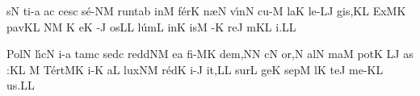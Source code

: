 \smallskip


\initiumgregorianum
{}%
s\punctum N\egn
\sgn ti-\punctum a\egn
\sgn {}a{}\punctum c\egn
\spatium
\sgn ces\punctum c\egn
\sgn s{\'e}-\clivis NM\egn
\sgn ru{nt}\punctum a\augmentum b\egn
\spatium
\divisiominima
\spatium
\sgn {}in\punctum M\egn
\sgn f{\'e}r\punctum K\egn
\sgn n{\ae}{}\punctum N\egn
\spatium
\sgn v{\'\i}n\punctum N\egn
\sgn cu-\punctum M\egn
\sgn la{}\punctum K\egn
\spatium
\sgn l{e}-\clivis LJ\egn
\sgn gi{s,}\punctum K\augmentum L\egn
\spatium
\divisiominor
\spatium
\sgn {}Ex\clivis MK\egn
\sgn pav\pes KL\egn
{}\clivis NM\egn
\custos K
\lineaproxima
{}e{}\punctum K\egn
\spatium
{}-\punctum J\egn
\sgn {}os\punctum L\augmentum L\egn
\spatium
\divisiominima
\spatium
\sgn l{\'u}m\punctum L\egn
\sgn {}in\punctum K\egn
\sgn {}is\punctum M\egn
\spatium
{}-\punctum K\egn
\sgn re{}\punctum J\egn
\spatium
{}m\pes KL\egn
\sgn {}i.\punctum L\augmentum L\egn
\Finisgregoriana


\smallskip


\initiumgregorianum
{}%
\sgn Pol\punctum N\egn
\sgn l{\'\i}c\punctum N\egn
\sgn {}i-\punctum a\egn
\sgn tam\punctum c\egn
\spatium
\sgn sed\punctum c\egn
\spatium
\sgn r{e}{dd}\clivis NM\egn
\sgn {}e{}\punctum a\egn
\spatium
\sgn f{i}-\clivis MK\egn
\sgn de{m,}\punctum N\augmentum N\egn
\spatium
\divisiominima
\spatium
{}c\punctum N\egn
\sgn {}o{r,}\punctum N\egn
\spatium
\sgn {}al\punctum N\egn
\sgn ma{}\punctum M\egn
\spatium
\sgn pot\punctum K\egn
{}\clivis LJ\egn
\sgn {}a{s :}\punctum K\augmentum L\egn
\spatium
\divisiominor
\spatium
\custos M
\lineaproxima
\sgn T{\'e}{rt}\clivis MK\egn
\sgn {}i-\punctum K\egn
\sgn {}a{}\punctum L\egn
\spatium
\sgn lux\clivis NM\egn
\spatium
\sgn r{\'e}d\punctum K\egn
\sgn {}i-\punctum J\egn
\sgn {}i{t,}\punctum L\augmentum L\egn
\spatium
\divisiominima
\spatium
\sgn s{u}r\punctum L\egn
\sgn ge{}\punctum K\egn
\spatium
\sgn sep\punctum M\egn
{}l\punctum K\egn
\sgn te{}\punctum J\egn
\spatium
\sgn m{e}-\pes KL\egn
\sgn {}u{s.}\punctum L\augmentum L\egn
\Finisgregoriana



